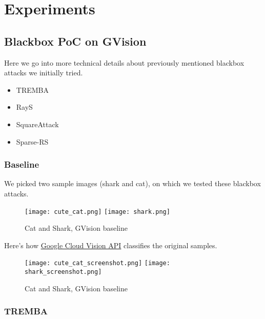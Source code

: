 \chapter{Experiments}
\label{experiments_chap}

\section{Blackbox PoC on GVision}
Here we go into more technical details about previously mentioned blackbox attacks we initially tried.

\begin{itemize}
    \item TREMBA
    \item RayS
    \item SquareAttack
    \item Sparse-RS
\end{itemize}

\subsection{Baseline}
We picked two sample images (shark and cat), on which we tested these blackbox attacks.

\begin{figure}[!htb]
\null\hspace{1cm}
  \texttt{[image: cute\_cat.png]}
\endminipage
\null\hspace{1cm}
  \texttt{[image: shark.png]}
\endminipage
\caption{Cat and Shark, GVision baseline}
\label{fig:cat_shark_original}
\end{figure}


Here's how \href{https://cloud.google.com/vision}{Google Cloud Vision API} classifies the original samples.

\begin{figure}[!htb]
  \texttt{[image: cute\_cat\_screenshot.png]}
\endminipage\hfill
{}
  \texttt{[image: shark\_screenshot.png]}
\endminipage\hfill
\caption{Cat and Shark, GVision baseline}
\label{fig:cat_shark_gvision_baseline}
\end{figure}

\subsection{TREMBA}


